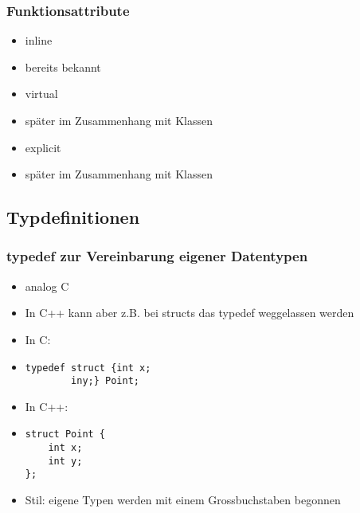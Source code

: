 \subsubsection{Funktionsattribute\hfill}
\label{sec:Funktionsattribute}
\begin{itemize}
	\item inline
	\item[\-] bereits bekannt
	\item virtual
	\item[\-] später im Zusammenhang mit Klassen
	\item explicit
	\item[\-] später im Zusammenhang mit Klassen
\end{itemize}


\subsection{Typdefinitionen\hfill}
\label{sec:Typdefinitionen}

\subsubsection{typedef zur Vereinbarung eigener Datentypen\hfill}
\label{sec:typedef zur Vereinbarung eigener Datentypen}
\begin{itemize}
	\item analog C
	\item In C++ kann aber z.B. bei structs das typedef weggelassen werden
	\item In C:
	\item[\-]
\noindent
\begin{minipage}{\linewidth}
\begin{lstlisting}
typedef struct {int x;
		iny;} Point;
\end{lstlisting}
\end{minipage}
	\item In C++:
	\item[\-]
\noindent
\begin{minipage}{\linewidth}
\begin{lstlisting}
struct Point {
	int x;
	int y;
};
\end{lstlisting}
\end{minipage}
	\item Stil: eigene Typen werden mit einem Grossbuchstaben begonnen
\end{itemize}

